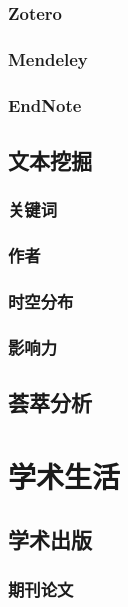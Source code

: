 \documentclass[]{book}
\begin{document}
\subsection{Zotero}\label{zotero}

\subsection{Mendeley}\label{mendeley}

\subsection{EndNote}\label{endnote}

\section{文本挖掘}

\subsection{关键词}

\subsection{作者}

\subsection{时空分布}

\subsection{影响力}

\section{荟萃分析}

\chapter{学术生活}

\section{学术出版}

\subsection{期刊论文}
\end{document}
